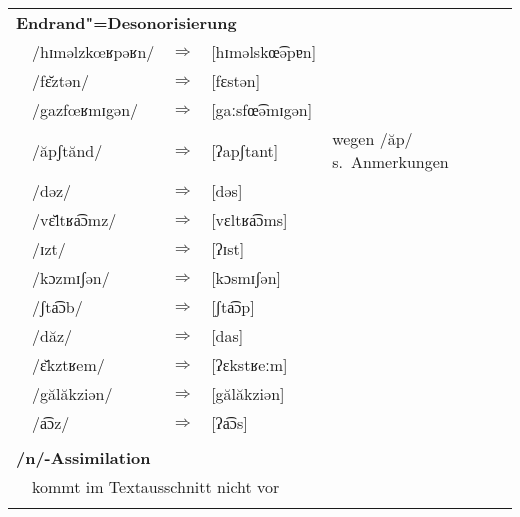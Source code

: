 \vspace{1\baselineskip}
\begin{longtable}[l]{p{0.1mm}lcll}
  \multicolumn{5}{l}{\textbf{Endrand"=Desonorisierung}}                                            \\
    & /hɪməlzkœʁpəʁn/    & $\Rightarrow$ & [hɪməlskœ͡əpɐn]      &                                   \\
    & /fɛ̆ztən/           & $\Rightarrow$ & [fɛstən]            &                                   \\
    & /gazfœʁmɪgən/      & $\Rightarrow$ & [gaːsfœ͡əmɪgən]      &                                   \\
    & /ăpʃtănd/          & $\Rightarrow$ & [ʔapʃtant]          & wegen /ăp/ s.\ Anmerkungen        \\
    & /dəz/              & $\Rightarrow$ & [dəs]               &                                   \\
    & /vɛ̆ltʁa͡ɔmz/        & $\Rightarrow$ & [vɛltʁa͡ɔms]         &                                   \\
    & /ɪzt/              & $\Rightarrow$ & [ʔɪst]              &                                   \\
    & /kɔzmɪʃən/         & $\Rightarrow$ & [kɔsmɪʃən]          &                                   \\
    & /ʃta͡ɔb/            & $\Rightarrow$ & [ʃta͡ɔp]             &                                   \\
    & /dăz/              & $\Rightarrow$ & [das]               &                                   \\
    & /ɛ̆kztʁem/          & $\Rightarrow$ & [ʔɛkstʁeːm]         &                                   \\
    & /gălăkziən/        & $\Rightarrow$ & [gălăkziən]         &                                   \\
    & /a͡ɔz/              & $\Rightarrow$ & [ʔa͡ɔs]              &                                   \\
  \multicolumn{5}{l}{ }                                                                            \\
  \multicolumn{5}{l}{\textbf{/n/-Assimilation}}                                                    \\
    & \multicolumn{4}{l}{kommt im Textausschnitt nicht vor}                                        \\
  \multicolumn{5}{l}{ }                                                                            \\

\end{longtable}
